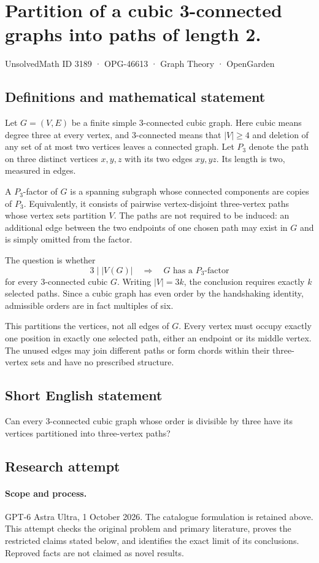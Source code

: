 \documentclass[11pt,a4paper]{article}
\begin{document}
\section*{Partition of a cubic 3-connected graphs into paths of length 2.}\label{3189}
{\small UnsolvedMath ID 3189 · OPG-46613 · Graph Theory · OpenGarden}
\subsection{Definitions and mathematical statement}
Let $G=(V,E)$ be a finite simple $3$-connected cubic
graph. Here cubic means degree three at every vertex,
and $3$-connected means that $|V|\geq4$ and deletion
of any set of at most two vertices leaves a
connected graph. Let $P_3$ denote the path on three
distinct vertices $x,y,z$ with its two edges $xy,yz$.
Its length is two, measured in edges.

A $P_3$-factor of $G$ is a spanning subgraph whose
connected components are copies of $P_3$. Equivalently,
it consists of pairwise vertex-disjoint three-vertex
paths whose vertex sets partition $V$. The paths
are not required to be induced: an additional edge
between the two endpoints of one chosen path may
exist in $G$ and is simply omitted from the factor.

The question is whether
\[
 3\mid |V(G)|\quad\Longrightarrow\quad
 G\text{ has a }P_3\text{-factor}
\]
for every $3$-connected cubic $G$. Writing $|V|=3k$,
the conclusion requires exactly $k$ selected paths.
Since a cubic graph has even order by the
handshaking identity, admissible orders are in fact
multiples of six.

This partitions the vertices, not all edges of
$G$. Every vertex must occupy exactly one position
in exactly one selected path, either an endpoint
or its middle vertex. The unused edges may join
different paths or form chords within their
three-vertex sets and have no prescribed structure.
\subsection{Short English statement}
Can every 3-connected cubic graph whose order is divisible by three have its vertices partitioned into three-vertex paths?
\subsection{Research attempt}
\paragraph{Scope and process.}
GPT-6 Astra Ultra, 1 October 2026. The catalogue formulation is retained above. This attempt checks the original problem and primary literature, proves the restricted claims stated below, and identifies the exact limit of its conclusions. Reproved facts are not claimed as novel results.
\end{document}
